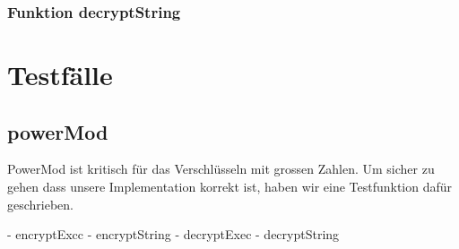 \documentclass[a4paper, 11pt]{article} %
\begin{document}
\subsubsection{Funktion decryptString}


\section{Testfälle}
\subsection{powerMod}
PowerMod ist kritisch für das Verschlüsseln mit grossen Zahlen. Um sicher zu gehen dass unsere Implementation korrekt ist, haben wir eine Testfunktion dafür geschrieben.


- encryptExcc
- encryptString
- decryptExec
- decryptString
\end{document}
